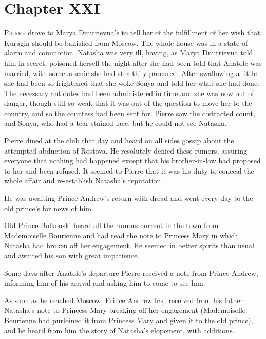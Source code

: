 \chapter*{Chapter XXI}
\ifaudio
{} 
\fi

\lettrine[lines=2, loversize=0.3, lraise=0]{\initfamily P}{ierre}
drove to Marya Dmitrievna's to tell her of the fulfillment
of her wish that Kuragin should be banished from Moscow. The
whole house was in a state of alarm and commotion. Natasha was
very ill, having, as Marya Dmitrievna told him in secret,
poisoned herself the night after she had been told that Anatole
was married, with some arsenic she had stealthily procured. After
swallowing a little she had been so frightened that she woke
Sonya and told her what she had done. The necessary antidotes had
been administered in time and she was now out of danger, though
still so weak that it was out of the question to move her to the
country, and so the countess had been sent for. Pierre saw the
distracted count, and Sonya, who had a tear-stained face, but he
could not see Natasha.

Pierre dined at the club that day and heard on all sides gossip
about the attempted abduction of Rostova. He resolutely denied
these rumors, assuring everyone that nothing had happened except
that his brother-in-law had proposed to her and been refused. It
seemed to Pierre that it was his duty to conceal the whole affair
and re-establish Natasha's reputation.

He was awaiting Prince Andrew's return with dread and went every
day to the old prince's for news of him.

Old Prince Bolkonski heard all the rumors current in the town
from Mademoiselle Bourienne and had read the note to Princess
Mary in which Natasha had broken off her engagement. He seemed in
better spirits than usual and awaited his son with great
impatience.

Some days after Anatole's departure Pierre received a note from
Prince Andrew, informing him of his arrival and asking him to
come to see him.

As soon as he reached Moscow, Prince Andrew had received from his
father Natasha's note to Princess Mary breaking off her
engagement (Mademoiselle Bourienne had purloined it from Princess
Mary and given it to the old prince), and he heard from him the
story of Natasha's elopement, with additions.


